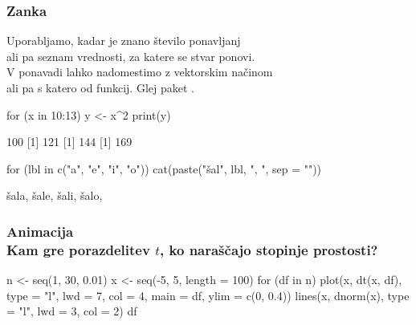 \begin{frame}[fragile]
\frametitle{Zanka }
Uporabljamo, kadar je znano število ponavljanj\\ ali pa seznam vrednosti, za katere se stvar ponovi.\\
V \R ponavadi lahko nadomestimo z vektorskim načinom\\ ali pa s katero od  funkcij. Glej paket .
\begin{Schunk}
\begin{Sinput}
 for (x in 10:13) {
     y <- x^2
     print(y)
 }
\end{Sinput}
\begin{Soutput}
[1] 100
[1] 121
[1] 144
[1] 169
\end{Soutput}
\begin{Sinput}
 for (lbl in c("a", "e", "i", "o")) cat(paste("šal", 
     lbl, ", ", sep = ""))
\end{Sinput}
\begin{Soutput}
šala, šale, šali, šalo, 
\end{Soutput}
\end{Schunk}
\end{frame}

\begin{frame}[fragile]
\frametitle{Animacija\\Kam gre  porazdelitev $t$, ko naraščajo stopinje prostosti?}
\begin{Schunk}
\begin{Sinput}
 n <- seq(1, 30, 0.01)
 x <- seq(-5, 5, length = 100)
 for (df in n) {
     plot(x, dt(x, df), type = "l", lwd = 7, col = 4, 
         main = df, ylim = c(0, 0.4))
     lines(x, dnorm(x), type = "l", lwd = 3, col = 2)
 }
 df
\end{Sinput}
\end{Schunk}
\end{frame}

